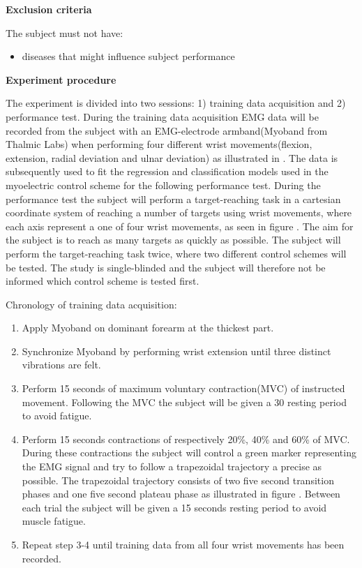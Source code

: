\textbf{Exclusion criteria}

The subject must not have:
\begin{itemize}
	\item diseases that might influence subject performance   
\end{itemize}


\textbf{Experiment procedure}

The experiment is divided into two sessions: 1) training data acquisition and 2) performance test. During the training data acquisition EMG data will be recorded from the subject with an EMG-electrode armband(Myoband from Thalmic Labs) when performing four different wrist movements(flexion, extension, radial deviation and ulnar deviation) as illustrated in . The data is subsequently used to fit the regression and classification models used in the myoelectric control scheme for the following performance test. During the performance test the subject will perform a target-reaching task in a cartesian coordinate system of reaching a number of targets using wrist movements, where each axis represent a one of four wrist movements, as seen in figure . The aim for the subject is to reach as many targets as quickly as possible. The subject will perform the target-reaching task twice, where two different control schemes will be tested. The study is single-blinded and the subject will therefore not be informed which control scheme is tested first.

Chronology of training data acquisition:
\begin{enumerate}
	\item Apply Myoband on dominant forearm at the thickest part.
	\item Synchronize Myoband by performing wrist extension until three distinct vibrations are felt.
	\item Perform 15 seconds of maximum voluntary contraction(MVC) of instructed movement. Following the MVC the subject will be given a 30 resting period to avoid fatigue.
	\item Perform 15 seconds contractions of respectively 20\%, 40\% and 60\% of MVC. During these contractions the subject will control a green marker representing the EMG signal and try to follow a trapezoidal trajectory a precise as possible. The trapezoidal trajectory consists of two five second transition phases and one five second plateau phase as illustrated in figure . Between each trial the subject will be given a 15 seconds resting period to avoid muscle fatigue.
	\item Repeat step 3-4 until training data from all four wrist movements has been recorded.
\end{enumerate}

